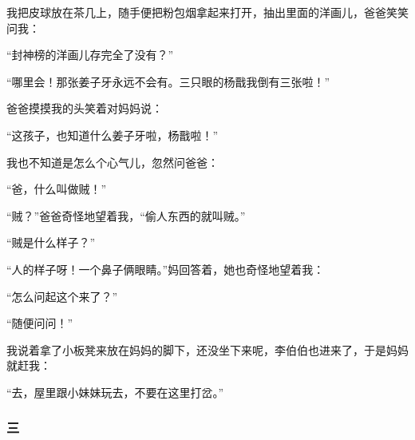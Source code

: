\par 我把皮球放在茶几上，随手便把粉包烟拿起来打开，抽出里面的洋画儿，爸爸笑笑问我：
\par “封神榜的洋画儿存完全了没有？”
\par “哪里会！那张姜子牙永远不会有。三只眼的杨戬我倒有三张啦！”
\par 爸爸摸摸我的头笑着对妈妈说：
\par “这孩子，也知道什么姜子牙啦，杨戬啦！”
\par 我也不知道是怎么个心气儿，忽然问爸爸：
\par “爸，什么叫做贼！”
\par “贼？”爸爸奇怪地望着我，“偷人东西的就叫贼。”
\par “贼是什么样子？”
\par “人的样子呀！一个鼻子俩眼睛。”妈回答着，她也奇怪地望着我：
\par “怎么问起这个来了？”
\par “随便问问！”
\par 我说着拿了小板凳来放在妈妈的脚下，还没坐下来呢，李伯伯也进来了，于是妈妈就赶我：
\par “去，屋里跟小妹妹玩去，不要在这里打岔。”




\subsubsection*{三}

